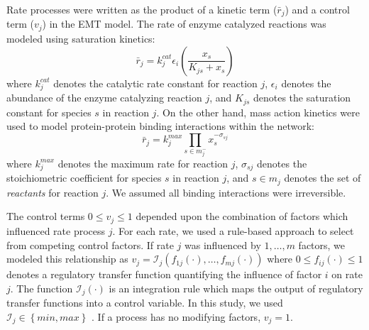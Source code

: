 \documentclass[12pt]{article}
\begin{document}
Rate processes were written as the product of a kinetic term ($\bar{r}_{j}$) and a control term ($v_{j}$) in the EMT model.
The rate of enzyme catalyzed reactions was modeled using saturation kinetics:
\begin{equation}\label{eqn:rate-saturation}
	\bar{r}_{j} = k_{j}^{cat}\epsilon_{i}\left(\frac{x_{s}}{K_{js} + x_{s}}\right)
\end{equation}
where $k_{j}^{cat}$ denotes the catalytic rate constant for reaction $j$, $\epsilon_{i}$ denotes the abundance of the enzyme catalyzing reaction $j$,
and $K_{js}$ denotes the saturation constant for species $s$ in reaction $j$.
On the other hand, mass action kinetics were used to model protein-protein binding interactions within the network:
\begin{equation}\label{eqn:rate-action}
	\bar{r}_{j} = k_{j}^{max}\prod_{s\in{m_{j}^{-}}}x_{s}^{-\sigma_{sj}}
\end{equation}
where $k_{j}^{max}$ denotes the maximum rate for reaction $j$, $\sigma_{sj}$ denotes the stoichiometric coefficient for species $s$ in reaction $j$,
and $s\in{m_{j}}$ denotes the set of \textit{reactants} for reaction $j$. We assumed all binding interactions were irreversible.

The control terms $0\leq v_{j}\leq 1$ depended upon the combination of factors which influenced rate process $j$.
For each rate, we used a rule-based approach to select from competing control factors.
If rate $j$ was influenced by $1,\dots,m$ factors, we modeled this relationship as
$v_{j}=\mathcal{I}_{j}\left(f_{1j}\left(\cdot\right),\hdots,f_{mj}\left(\cdot\right)\right)$
where $0\leq f_{ij}\left(\cdot\right)\leq 1$ denotes a regulatory transfer function quantifying the influence of factor $i$ on rate $j$.
The function $\mathcal{I}_{j}\left(\cdot\right)$ is an integration rule which maps the output of regulatory transfer functions into a control
variable. In this study, we used $\mathcal{I}_{j}\in\left\{min,max\right\}$ \citep{pr3010178}. If a process has no modifying factors, $v_{j}=1$.
\end{document}
